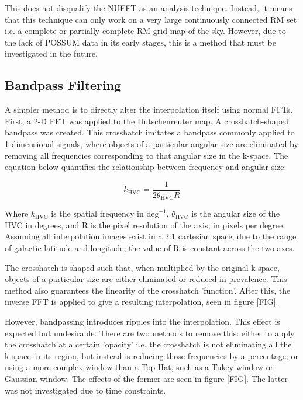 This does not disqualify the NUFFT as an analysis technique. Instead, it means that this technique can only work on a very large continuously connected RM set i.e. a complete or partially complete RM grid map of the sky. However, due to the lack of POSSUM data in its early stages, this is a method that must be investigated in the future.

\subsection{Bandpass Filtering}
\label{ssec:bandpass}

A simpler method is to directly alter the interpolation itself using normal FFTs. First, a 2-D FFT was applied to the Hutschenreuter map. A crosshatch-shaped bandpass was created. This crosshatch imitates a bandpass commonly applied to 1-dimensional signals, where objects of a particular angular size are eliminated by removing all frequencies corresponding to that angular size in the k-space. The equation below quantifies the relationship between frequency and angular size:


\begin{equation}
        k_{\mathrm{HVC}} = \frac{1}{2 \theta_{\mathrm{HVC}} R}
    \label{eq:freq_to_angle}
\end{equation}


Where $k_{\mathrm{HVC}}$ is the spatial frequency in $\mathrm{deg}^{-1}$, $\theta_{\mathrm{HVC}}$ is the angular size of the HVC in degrees, and R is the pixel resolution of the axis, in pixels per degree. Assuming all interpolation images exist in a 2:1 cartesian space, due to the range of galactic latitude and longitude, the value of R is constant across the two axes.


The crosshatch is shaped such that, when multiplied by the original k-space, objects of a particular size are either eliminated or reduced in prevalence. This method also guarantees the linearity of the crosshatch 'function'. After this, the inverse FFT is applied to give a resulting interpolation, seen in figure [FIG].


However, bandpassing introduces ripples into the interpolation. This effect is expected but undesirable. There are two methods to remove this: either to apply the crosshatch at a certain 'opacity' i.e. the crosshatch is not eliminating all the k-space in its region, but instead is reducing those frequencies by a percentage; or using a more complex window than a Top Hat, such as a Tukey window or Gaussian window. The effects of the former are seen in figure [FIG]. The latter was not investigated due to time constraints.


